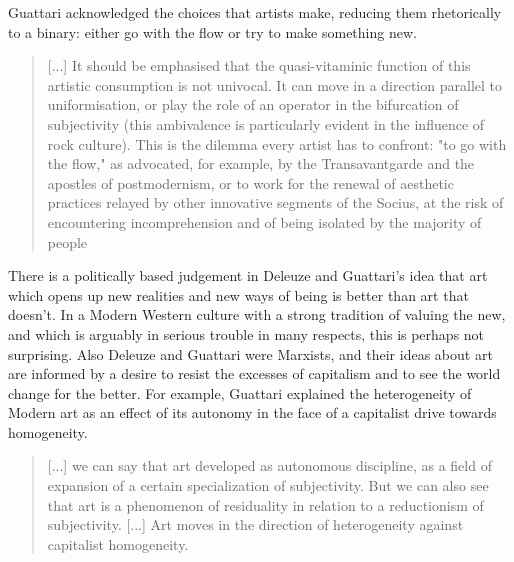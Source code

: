         Guattari acknowledged the choices that artists make, reducing them rhetorically to a binary: either go with the flow or try to make something new.

		\begin{quote}
			[...] It should be emphasised that the quasi-vitaminic function of this artistic consumption is not univocal. It can move in a direction parallel to uniformisation, or play the role of an operator in the bifurcation of subjectivity (this ambivalence is particularly evident in the influence of rock culture). This is the dilemma every artist has to confront: "to go with the flow," as advocated, for example, by the Transavantgarde and the apostles of postmodernism, or to work for the renewal of aesthetic practices relayed by other innovative segments of the Socius, at the risk of encountering incomprehension and of being isolated by the majority of people \citep[p.132]{GuattariChsmss1995}
		\end{quote}

        There is a politically based judgement in Deleuze and Guattari's idea that art which opens up new realities and new ways of being is better than art that doesn't. In a Modern Western culture with a strong tradition of valuing the new, and which is arguably in serious trouble in many respects, this is perhaps not surprising. Also Deleuze and Guattari were Marxists, and their ideas about art are informed by a desire to resist the excesses of capitalism and to see the world change for the better. For example, Guattari explained the heterogeneity of Modern art as an effect of its autonomy in the face of a capitalist drive towards homogeneity.

        \begin{quote}
            [...] we can say that art developed as autonomous discipline, as a field of expansion of a certain specialization of subjectivity. But we can also see that art is a phenomenon of residuality in relation to a reductionism of subjectivity. [...] Art moves in the direction of heterogeneity against capitalist homogeneity. \citep[p.5]{GuattariOlivierFlxGttrEtLArtCntmprn1994}
        \end{quote}

